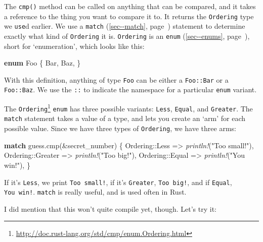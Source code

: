 \documentclass[a4paper,]{book}
\renewcommand*{\hyperlink}[2]{%
 #2 (\autoref{#1}, page~\pageref{#1})}
\newenvironment{Shaded}{\begin{snugshade}}{\end{snugshade}}
\newcommand{\KeywordTok}[1]{\textcolor[rgb]{0.13,0.29,0.53}{\textbf{{#1}}}}
\newcommand{\StringTok}[1]{\textcolor[rgb]{0.31,0.60,0.02}{{#1}}}
\newcommand{\PreprocessorTok}[1]{\textcolor[rgb]{0.56,0.35,0.01}{\textit{{#1}}}}
\newcommand{\NormalTok}[1]{{#1}}
\renewcommand{\href}[2]{#2\footnote{\url{#1}}}
\begin{document}
The \texttt{cmp()} method can be called on anything that can be
compared, and it takes a reference to the thing you want to compare it
to. It returns the \texttt{Ordering} type we \texttt{use}d earlier. We
use a \protect\hyperlink{sec--match}{\texttt{match}} statement to
determine exactly what kind of \texttt{Ordering} it is.
\texttt{Ordering} is an \protect\hyperlink{sec--enums}{\texttt{enum}},
short for `enumeration', which looks like this:

\begin{Shaded}
\begin{Highlighting}[]
\KeywordTok{enum} \NormalTok{Foo \{}
    \NormalTok{Bar,}
    \NormalTok{Baz,}
\NormalTok{\}}
\end{Highlighting}
\end{Shaded}

With this definition, anything of type \texttt{Foo} can be either a
\texttt{Foo::Bar} or a \texttt{Foo::Baz}. We use the \texttt{::} to
indicate the namespace for a particular \texttt{enum} variant.

The
\href{http://doc.rust-lang.org/std/cmp/enum.Ordering.html}{\texttt{Ordering}}
\texttt{enum} has three possible variants: \texttt{Less},
\texttt{Equal}, and \texttt{Greater}. The \texttt{match} statement takes
a value of a type, and lets you create an `arm' for each possible value.
Since we have three types of \texttt{Ordering}, we have three arms:

\begin{Shaded}
\begin{Highlighting}[]
\KeywordTok{match} \NormalTok{guess.cmp(&secret_number) \{}
    \NormalTok{Ordering::Less    => }\PreprocessorTok{println!}\NormalTok{(}\StringTok{"Too small!"}\NormalTok{),}
    \NormalTok{Ordering::Greater => }\PreprocessorTok{println!}\NormalTok{(}\StringTok{"Too big!"}\NormalTok{),}
    \NormalTok{Ordering::Equal   => }\PreprocessorTok{println!}\NormalTok{(}\StringTok{"You win!"}\NormalTok{),}
\NormalTok{\}}
\end{Highlighting}
\end{Shaded}

If it's \texttt{Less}, we print \texttt{Too\ small!}, if it's
\texttt{Greater}, \texttt{Too\ big!}, and if \texttt{Equal},
\texttt{You\ win!}. \texttt{match} is really useful, and is used often
in Rust.

I did mention that this won't quite compile yet, though. Let's try it:
\end{document}
